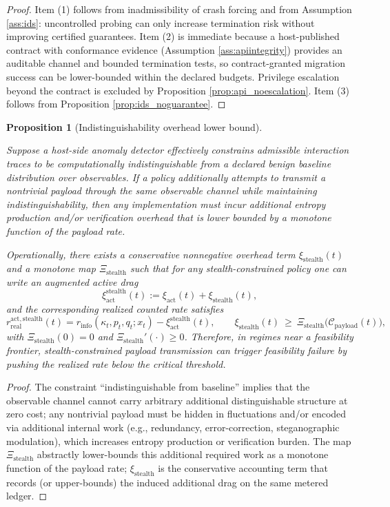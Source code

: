 \documentclass[11pt,a4paper]{article}
\newcommand{\DependsOn}[1]{\par\noindent{\footnotesize\texttt{DependsOn: }\nolinkurl{#1}}\par}
\newtheorem{proposition}{Proposition}
\theoremstyle{definition}
\theoremstyle{remark}
\begin{document}
\begin{proof}
Item (1) follows from inadmissibility of crash forcing and from Assumption \ref{ass:ids}: uncontrolled probing can only increase termination risk without improving certified guarantees.
Item (2) is immediate because a host-published contract with conformance evidence (Assumption \ref{ass:apiintegrity}) provides an auditable channel and bounded termination tests, so contract-granted migration success can be lower-bounded within the declared budgets. Privilege escalation beyond the contract is excluded by Proposition \ref{prop:api_noescalation}.
Item (3) follows from Proposition \ref{prop:ids_noguarantee}.
\end{proof}

\begin{proposition}[Indistinguishability overhead lower bound]\label{prop:stealthcost}
\DependsOn{global=foundation;refs=[]}
Suppose a host-side anomaly detector effectively constrains admissible interaction traces to be computationally indistinguishable from a declared benign baseline distribution over observables.
If a policy additionally attempts to transmit a nontrivial payload through the same observable channel while maintaining indistinguishability, then any implementation must incur additional entropy production and/or verification overhead that is lower bounded by a monotone function of the payload rate.

Operationally, there exists a conservative nonnegative overhead term $\xi_{\mathrm{stealth}}(t)$ and a monotone map $\Xi_{\mathrm{stealth}}$ such that for any stealth-constrained policy one can write an augmented active drag
\[
\xi_{\mathrm{act}}^{\mathrm{stealth}}(t):=\xi_{\mathrm{act}}(t)+\xi_{\mathrm{stealth}}(t),
\]
and the corresponding realized counted rate satisfies
\[
r_{\mathrm{real}}^{\mathrm{act,stealth}}(t)
=
r_{\mathrm{info}}(\kappa_t,p_t,q_t;x_t)-\xi_{\mathrm{act}}^{\mathrm{stealth}}(t),
\qquad
\xi_{\mathrm{stealth}}(t)\ \ge\ \Xi_{\mathrm{stealth}}\!\big(\mathcal C_{\mathrm{payload}}(t)\big),
\]
with $\Xi_{\mathrm{stealth}}(0)=0$ and $\Xi_{\mathrm{stealth}}'(\cdot)\ge 0$.
Therefore, in regimes near a feasibility frontier, stealth-constrained payload transmission can trigger feasibility failure by pushing the realized rate below the critical threshold.
\end{proposition}

\begin{proof}
The constraint ``indistinguishable from baseline'' implies that the observable channel cannot carry arbitrary additional distinguishable structure at zero cost; any nontrivial payload must be hidden in fluctuations and/or encoded via additional internal work (e.g., redundancy, error-correction, steganographic modulation), which increases entropy production or verification burden.
The map $\Xi_{\mathrm{stealth}}$ abstractly lower-bounds this additional required work as a monotone function of the payload rate; $\xi_{\mathrm{stealth}}$ is the conservative accounting term that records (or upper-bounds) the induced additional drag on the same metered ledger.
\end{proof}
\end{document}
